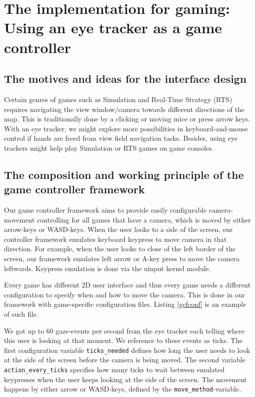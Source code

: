\documentclass[english]{tktltiki}
\begin{document}


\section{The implementation for gaming: Using an eye tracker as a game controller}


\subsection{The motives and ideas for the interface design}

Certain genres of games such as Simulation and Real-Time Strategy (RTS) requires navigating the view window/camera towards different directions of the map. This is traditionally done by a clicking or moving mice or press arrow keys. With an eye tracker, we might explore more possibilities in keyboard-and-mouse control if hands are freed from view field navigation tasks. Besides, using eye trackers might help play Simulation or RTS games on game consoles.


\subsection{The composition and working principle of the game controller framework}

Our game controller framework aims to provide easily configurable camera-movement controlling for all games that have a camera, which is moved by either arrow-keys or WASD-keys. When the user looks to a side of the screen, our controller framework emulates keyboard keypress to move camera in that direction. For example, when the user looks to close of the left border of the screen, our framework emulates left arrow or A-key press to move the camera leftwards. Keypress emulation is done via the uinput kernel module.

Every game has different 2D user interface and thus every game needs a different configuration to specify when and how to move the camera. This is done in our framework with game-specific configuration files. Listing \ref{gcfconf} is an example of such file.

We got up to 60 gaze-events per second from the eye tracker each telling where this user is looking at that moment. We reference to these events as ticks. The first configuration variable \verb|ticks_needed| defines how long the user needs to look at the side of the screen before the camera is being moved. The second variable \verb|action_every_ticks| specifies how many ticks to wait between emulated keypresses when the user keeps looking at the side of the screen. The movement happens by either arrow or WASD-keys, defined by the \verb|move_method|-variable.
\end{document}
